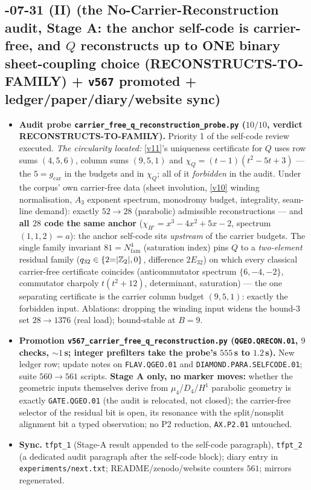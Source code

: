 \subsection*{-07-31 (II) (the No-Carrier-Reconstruction audit, Stage A: the anchor self-code is carrier-free, and $Q$ reconstructs up to ONE binary sheet-coupling choice (RECONSTRUCTS-TO-FAMILY) + \texttt{v567} promoted + ledger/paper/diary/website sync)}
\begin{itemize}[leftmargin=1.5em]
\item \textbf{Audit probe \texttt{carrier\_free\_q\_reconstruction\_probe.py} ($10/10$, verdict
RECONSTRUCTS-TO-FAMILY).} Priority 1 of the self-code review executed.  \emph{The circularity
located:} \vref{v11}'s uniqueness certificate for $Q$ uses row sums $(4,5,6)$, column sums
$(9,5,1)$ and $\chi_Q=(t{-}1)(t^2{-}5t{+}3)$ --- the $5=g_{\mathrm{car}}$ in the budgets and in
$\chi_Q$; all of it \emph{forbidden} in the audit.  Under the corpus' own carrier-free data
(sheet involution, \vref{v10} winding normalisation, $A_3$ exponent spectrum, monodromy budget,
integrality, seam-line demand): exactly $52\to28$ (parabolic) admissible reconstructions --- and
\textbf{all $28$ code the same anchor} ($\chi_{H'}=x^3-4x^2+5x-2$, spectrum $(1,1,2)=a$): the
anchor self-code sits \emph{upstream} of the carrier budgets.  The single family invariant
$81=N_{\mathrm{fam}}^4$ (saturation index) pins $Q$ to a \emph{two-element} residual family
($q_{32}\in\{2{=}|\mathbb{Z}_2|,0\}$, difference $2E_{32}$) on which every classical carrier-free
certificate coincides (anticommutator spectrum $\{6,-4,-2\}$, commutator charpoly $t(t^2{+}12)$,
determinant, saturation) --- the one separating certificate is the carrier column budget
$(9,5,1)$: exactly the forbidden input.  Ablations: dropping the winding input widens the
bound-$3$ set $28\to1376$ (real load); bound-stable at $B=9$.
\item \textbf{Promotion \texttt{v567\_carrier\_free\_q\_reconstruction.py}
(\texttt{QGEO.QRECON.01}, $9$ checks, ${\sim}1$\,s; integer prefilters take the probe's $555$\,s
to $1.2$\,s).} New ledger row; update notes on \texttt{FLAV.QGEO.01} and
\texttt{DIAMOND.PARA.SELFCODE.01}; suite $560\to561$ scripts.  \textbf{Stage A only, no marker
moves:} whether the geometric inputs themselves derive from $\mu_4$/$D_4$/$H^1$ parabolic
geometry is exactly \texttt{GATE.QGEO.01} (the audit is relocated, not closed); the carrier-free
selector of the residual bit is open, its resonance with the split/nonsplit alignment bit a typed
observation; no P2 reduction, \texttt{AX.P2.01} untouched.
\item \textbf{Sync.} \texttt{tfpt\_1} (Stage-A result appended to the self-code paragraph),
\texttt{tfpt\_2} (a dedicated audit paragraph after the self-code block); diary entry in
\texttt{experiments/next.txt}; README/zenodo/website counters $561$; mirrors regenerated.
\end{itemize}

